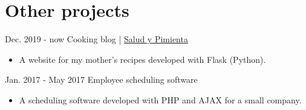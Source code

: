 \documentclass[]{commands}
\begin{document}
\section{Other projects}
\begin{entrylist}
 
   \entry
    {Dec. 2019 - now}
    {Cooking blog | }
    {\href{https://www.saludypimienta.com/}{\small Salud y Pimienta \faMousePointer}}
    {}
    {\jobspace
    \begin{itemize}[leftmargin=*, itemsep = 0.1em]
        \item A website for my mother's recipes developed with Flask (Python).\\
    \end{itemize}}
    
   \entry
    {Jan. 2017 - May 2017}
    {Employee scheduling software}
    {}
    {}
    {\jobspace
    \begin{itemize}[leftmargin=*, itemsep = 0.1em]
        \item A scheduling software developed with PHP and AJAX for a small company.\\
    \end{itemize}}
    \vspace{-4mm}
\end{entrylist}
\end{document}
